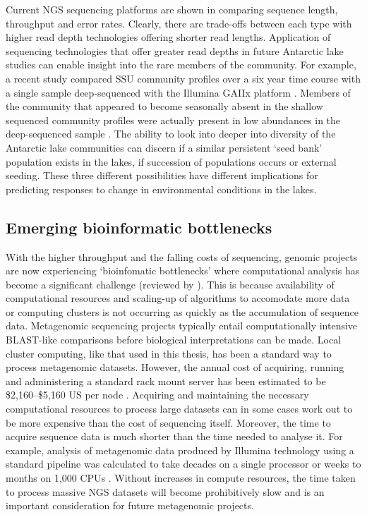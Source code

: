 Current \ac{NGS} sequencing platforms are shown in  comparing sequence length, throughput and error rates.
Clearly, there are trade-offs between each type with higher read depth technologies offering shorter read lengths. 
Application of sequencing technologies that offer greater read depths in future Antarctic lake studies can enable insight into the rare members of the community.
For example, a recent study compared \acs{SSU} community profiles over a six year time course with a single sample deep-sequenced with the Illumina GAIIx platform \cite{Caporaso2012}.
Members of the community that appeared to become seasonally absent in the shallow sequenced community profiles were actually present in low abundances in the deep-sequenced sample \cite{Caporaso2012}.
The ability to look into deeper into diversity of the Antarctic lake communities can discern if a similar persistent `seed bank' population exists in the lakes, if succession of populations occurs or external seeding.
These three different possibilities have different implications for predicting responses to change in environmental conditions in the lakes.


\subsection{Emerging bioinformatic bottlenecks}
With the higher throughput and the falling costs of sequencing, genomic projects are now experiencing `bioinfomatic bottlenecks' where computational analysis has become a significant challenge (reviewed by \citet{Scholz2012}).
This is because availability of computational resources and scaling-up of algorithms to accomodate more data or computing clusters is not occurring as quickly as the accumulation of sequence data.
Metagenomic sequencing projects typically entail computationally intensive \acs{BLAST}-like comparisons before biological interpretations can be made.
Local cluster computing, like that used in this thesis, has been a standard way to process metagenomic datasets.
However, the annual cost of acquiring, running and administering a standard rack mount server has been estimated to be \$2,160--\$5,160 US per node \cite{Wilkening2009}.
Acquiring and maintaining the necessary computational resources to process large datasets can in some cases work out to be more expensive than the cost of sequencing itself.
Moreover, the time to acquire sequence data is much shorter than the time needed to analyse it.
For example, analysis of metagenomic data produced by Illumina technology using a standard pipeline was calculated to take decades on a single processor or weeks to months on 1,000 \acs{CPU}s \cite{Evanko2009}.
Without increases in compute resources, the time taken to process massive \ac{NGS} datasets will become prohibitively slow and is an important consideration for future metagenomic projects.

